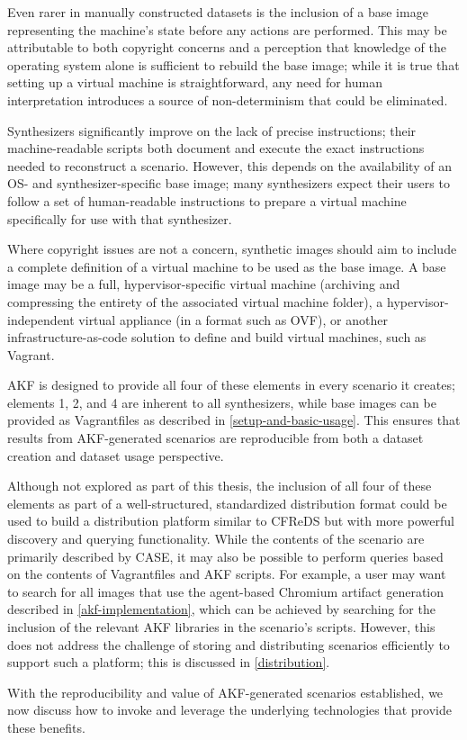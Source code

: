 Even rarer in manually constructed datasets is the inclusion of a base
image representing the machine's state before any actions are performed.
This may be attributable to both copyright concerns and a perception
that knowledge of the operating system alone is sufficient to rebuild
the base image; while it is true that setting up a virtual machine is
straightforward, any need for human interpretation introduces a source
of non-determinism that could be eliminated.

Synthesizers significantly improve on the lack of precise instructions;
their machine-readable scripts both document and execute the exact
instructions needed to reconstruct a scenario. However, this depends on
the availability of an OS- and synthesizer-specific base image; many
synthesizers expect their users to follow a set of human-readable
instructions to prepare a virtual machine specifically for use with that
synthesizer.

Where copyright issues are not a concern, synthetic images should aim to
include a complete definition of a virtual machine to be used as the
base image. A base image may be a full, hypervisor-specific virtual
machine (archiving and compressing the entirety of the associated
virtual machine folder), a hypervisor-independent virtual appliance (in
a format such as OVF), or another infrastructure-as-code solution to
define and build virtual machines, such as Vagrant.

AKF is designed to provide all four of these elements in every scenario
it creates; elements 1, 2, and 4 are inherent to all synthesizers, while
base images can be provided as Vagrantfiles as described in \autoref{setup-and-basic-usage}. This ensures that
results from AKF-generated scenarios are reproducible from both a
dataset creation and dataset usage perspective.

Although not explored as part of this thesis, the inclusion of all four
of these elements as part of a well-structured, standardized
distribution format could be used to build a distribution platform
similar to CFReDS but with more powerful discovery and querying
functionality. While the contents of the scenario are primarily
described by CASE, it may also be possible to perform queries based on
the contents of Vagrantfiles and AKF scripts. For example, a user may
want to search for all images that use the agent-based Chromium artifact
generation described in \autoref{akf-implementation}, which can be achieved by searching for the inclusion of
the relevant AKF libraries in the scenario's scripts. However, this does
not address the challenge of storing and distributing scenarios
efficiently to support such a platform; this is discussed in
\autoref{distribution}.

With the reproducibility and value of AKF-generated scenarios
established, we now discuss how to invoke and leverage the underlying
technologies that provide these benefits.
